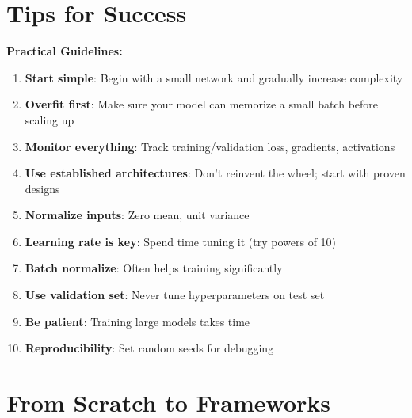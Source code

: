 \section{Tips for Success}

\begin{summary}
\textbf{Practical Guidelines:}

\begin{enumerate}
    \item \textbf{Start simple}: Begin with a small network and gradually increase complexity
    
    \item \textbf{Overfit first}: Make sure your model can memorize a small batch before scaling up
    
    \item \textbf{Monitor everything}: Track training/validation loss, gradients, activations
    
    \item \textbf{Use established architectures}: Don't reinvent the wheel; start with proven designs
    
    \item \textbf{Normalize inputs}: Zero mean, unit variance
    
    \item \textbf{Learning rate is key}: Spend time tuning it (try powers of 10)
    
    \item \textbf{Batch normalize}: Often helps training significantly
    
    \item \textbf{Use validation set}: Never tune hyperparameters on test set
    
    \item \textbf{Be patient}: Training large models takes time
    
    \item \textbf{Reproducibility}: Set random seeds for debugging
\end{enumerate}
\end{summary}

\section{From Scratch to Frameworks}


